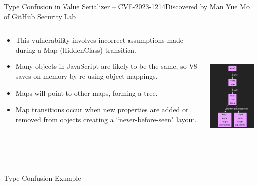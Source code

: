 \begin{frame}{Type Confusion in Value Serializer -- CVE-2023-1214}{Discovered by Man Yue Mo of GitHub Security Lab}
    \begin{columns}
        \begin{column}{0.7\textwidth}
            \begin{itemize}
                \item This vulnerability involves incorrect assumptions made during a Map (HiddenClass) transition.
                \item Many objects in JavaScript are likely to be the same, so V8 saves on memory by re-using object mappings.
                \item Maps will point to other maps, forming a tree.
                \item Map transitions occur when new properties are added or removed from objects creating a ``never-before-seen" layout. 
            \end{itemize}
        \href{https://bugs.chromium.org/p/chromium/issues/detail?id=1412487}{\color{pink}{crbug-1412487}}
        \end{column}
        \begin{column}{0.3\textwidth}
            \includegraphics[height=6.5cm]{images/v8-hiddenclass.png}
        \end{column}
    \end{columns}
\end{frame}

\begin{frame}[fragile]{Type Confusion Example}
    \begin{columns}
        \begin{column}{0.5\textwidth}
            \inputminted{C}{code/type-confusion.tex}
        \end{column}
        \begin{column}{0.5\textwidth}
            \inputminted{C}{code/type-confusion-exploit.tex}
        \end{column}
    \end{columns}
\end{frame}